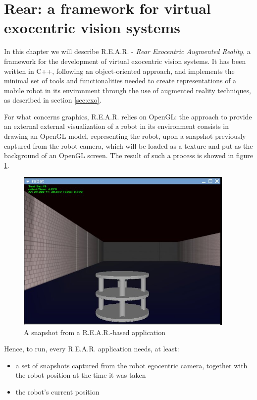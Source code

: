 \section{Rear: a framework for virtual exocentric vision systems}
\label{sec:rear}

In this chapter we will describe \textsf{R.E.A.R.} - 
\textit{Rear Exocentric Augmented Reality}, a framework 
for the development of virtual exocentric vision systems.
%
It has been written in C++, following an object-oriented 
approach, and implements the minimal set of tools and functionalities 
needed to create representations of a mobile robot in its environment 
through the use of augmented reality techniques, as described in 
section \ref{sec:exo}.
%

%
For what concerns graphics, \textsf{R.E.A.R.} relies on OpenGL: the approach 
to provide an external external visualization of a robot in its 
environment consists in drawing an OpenGL model, representing the robot,
upon a snapshot previously captured from the robot camera, which will be 
loaded as a texture and put as the background of an OpenGL screen. The result 
of such a process is showed in figure \ref{fig:snap}.
%
\begin{figure}[!h]
  \begin{center}
    \includegraphics[width=300pt]{img/rear_snapshot_large.jpg}
    \caption{A snapshot from a \textsf{R.E.A.R.}-based application}
    \label{fig:snap}
  \end{center}
\end{figure}
%
Hence, to run, every \textsf{R.E.A.R.} application needs, at least:
%
\begin{itemize}
  \item a set of snapshots captured from the robot egocentric camera, 
    together with the robot position at the time it was taken
  \item the robot's current position
\end{itemize}
